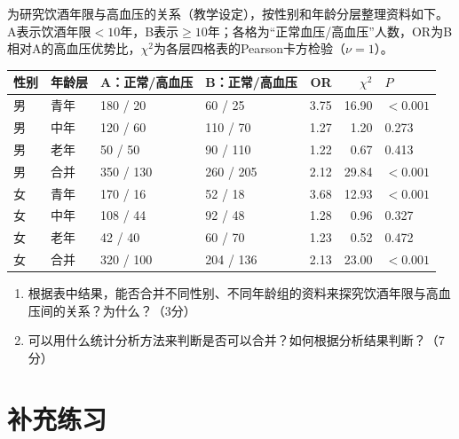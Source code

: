 \par\addvspace{8pt}\noindent\begin{minipage}{\linewidth}


为研究饮酒年限与高血压的关系（教学设定），按性别和年龄分层整理资料如下。A表示饮酒年限\(<10\)年，B表示\(\ge10\)年；各格为``正常血压/高血压''人数，OR为B相对A的高血压优势比，\(\chi^2\)为各层四格表的Pearson卡方检验（\(\nu=1\)）。

\begin{center}\small\setlength{\tabcolsep}{4pt}\renewcommand{\arraystretch}{1.22}\begin{tabular}{@{}llllrrl@{}}
\toprule
性别 & 年龄层 & A：正常/高血压 & B：正常/高血压 & OR & \(\chi^2\) & \(P\) \\
\midrule
男 & 青年 & 180 / 20 & 60 / 25 & 3.75 & 16.90 & \(<0.001\) \\
男 & 中年 & 120 / 60 & 110 / 70 & 1.27 & 1.20 & 0.273 \\
男 & 老年 & 50 / 50 & 90 / 110 & 1.22 & 0.67 & 0.413 \\
男 & 合并 & 350 / 130 & 260 / 205 & 2.12 & 29.84 & \(<0.001\) \\
女 & 青年 & 170 / 16 & 52 / 18 & 3.68 & 12.93 & \(<0.001\) \\
女 & 中年 & 108 / 44 & 92 / 48 & 1.28 & 0.96 & 0.327 \\
女 & 老年 & 42 / 40 & 60 / 70 & 1.23 & 0.52 & 0.472 \\
女 & 合并 & 320 / 100 & 204 / 136 & 2.13 & 23.00 & \(<0.001\) \\
\bottomrule\end{tabular}\end{center}

\begin{enumerate}
\def\labelenumi{\arabic{enumi}.}
\tightlist
\item
  根据表中结果，能否合并不同性别、不同年龄组的资料来探究饮酒年限与高血压间的关系？为什么？（3分）
\item
  可以用什么统计分析方法来判断是否可以合并？如何根据分析结果判断？（7分）
\end{enumerate}


\end{minipage}\par\vspace{5pt}


\clearpage\section{补充练习}

